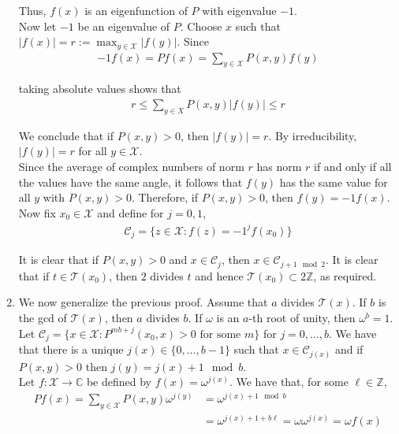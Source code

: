 \documentclass[12pt]{article}
\begin{document}
\begin{enumerate}[\alph*)]
Thus, $f(x)$ is an eigenfunction of $P$ with eigenvalue $-1$.\\

Now let $-1$ be an eigenvalue of $P$. Choose $x$ such that $|f(x)| = r := \max_{y \in \mathcal{X}} |f(y)|$. Since
\begin{align*}
-1f(x) = Pf(x) = \sum_{y \in \mathcal{X}} P(x,y)f(y)
\end{align*}

taking absolute values shows that 
\begin{align*}
r \leq \sum_{y \in X} P(x,y) |f(y)| \leq r
\end{align*}

We conclude that if $P(x, y) > 0$, then $|f(y)| = r$. By irreducibility, $|f(y)| = r$ for all $y \in \mathcal{X}$.\\

Since the average of complex numbers of norm $r$ has norm $r$ if and only if all the values have the same angle, it follows that $f(y)$ has the same value for all $y$ with $P(x,y) > 0$. Therefore, if $P(x,y) > 0$, then $f(y) = -1f(x)$. Now fix $x_0 \in \mathcal{X}$ and define for $j = 0, 1$,
\begin{align*}
\mathcal{C}_j = \{z \in \mathcal{X}: f(z) = -1^j f(x_0)\}
\end{align*}

It is clear that if $P(x,y)>0$ and $x \in \mathcal{C}_j$, then $x \in \mathcal{C}_{j + 1 \mod 2}$. It is clear that if $t \in \mathcal{T}(x_0)$, then $2$ divides $t$ and hence $\mathcal{T}(x_0) \subset 2\mathbb{Z}$, as required.

\item We now generalize the previous proof. Assume that $a$ divides $\mathcal{T}(x)$. If $b$ is the gcd of $\mathcal{T}(x)$, then $a$ divides $b$. If $\omega$ is an $a$-th root of unity, then $\omega^b = 1$. Let $\mathcal{C}_j = \{x \in \mathcal{X}: P^{mb + j}(x_0, x) > 0 \text{ for some } m\}$ for $j = 0, \ldots, b$. We have that there is a unique $j(x) \in \{0, \ldots, b-1\}$ such that $x \in \mathcal{C}_{j(x)}$ and  if $P(x,y) > 0$ then $j(y) = j(x) + 1 \mod b$.\\

Let $f: \mathcal{X} \to \mathbb{C}$ be defined by $f(x) = \omega^{j(x)}$. We have that, for some $\ell \in \mathbb{Z}$,
\begin{align*}
Pf(x) = \sum_{y \in \mathcal{X}} P(x,y) \omega^{j(y)} &= \omega^{j(x) + 1 \mod b}\\
&= \omega^{j(x) + 1 + b\ell} = \omega \omega^{j(x)} = \omega f(x) 
\end{align*}


\end{enumerate}
\end{document}
